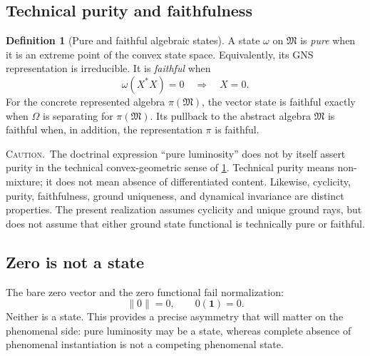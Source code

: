 \documentclass[11pt,reqno]{scrartcl}
\newcommand{\idop}{\mathbf 1}
\newcommand{\warninglabel}{\par\smallskip\noindent\textsc{Caution.}\ }
\theoremstyle{plain}
\theoremstyle{definition}
\newtheorem{definition}[definition]{Definition}
\theoremstyle{remark}
\begin{document}
\subsection{Technical purity and faithfulness}

\begin{definition}[Pure and faithful algebraic states]
\label{def:pure-faithful-state}
A state $\omega$ on $\mathfrak M$ is \emph{pure} when it is an extreme point
of the convex state space.  Equivalently, its GNS representation is
irreducible.  It is \emph{faithful} when
\begin{equation}
  \omega(X^*X)=0
  \quad\Longrightarrow\quad
  X=0.
\end{equation}
For the concrete represented algebra $\pi(\mathfrak M)$, the vector state is
faithful exactly when $\Omega$ is separating for $\pi(\mathfrak M)$.  Its
pullback to the abstract algebra $\mathfrak M$ is faithful when, in addition,
the representation $\pi$ is faithful.
\end{definition}

\warninglabel The doctrinal expression ``pure luminosity'' does not by itself
assert purity in the technical convex-geometric sense of
\cref{def:pure-faithful-state}.  Technical purity means non-mixture; it does
not mean absence of differentiated content.  Likewise, cyclicity, purity,
faithfulness, ground uniqueness, and dynamical invariance are distinct
properties.  The present realization assumes cyclicity and unique ground
rays, but does not assume that either ground state functional is technically
pure or faithful.

\subsection{Zero is not a state}

The bare zero vector and the zero functional fail normalization:
\begin{equation}
  \|0\|=0,
  \qquad
  0(\idop)=0.
\end{equation}
Neither is a state.  This provides a precise asymmetry that will matter on the
phenomenal side: pure luminosity may be a state, whereas complete absence of
phenomenal instantiation is not a competing phenomenal state.
\end{document}

